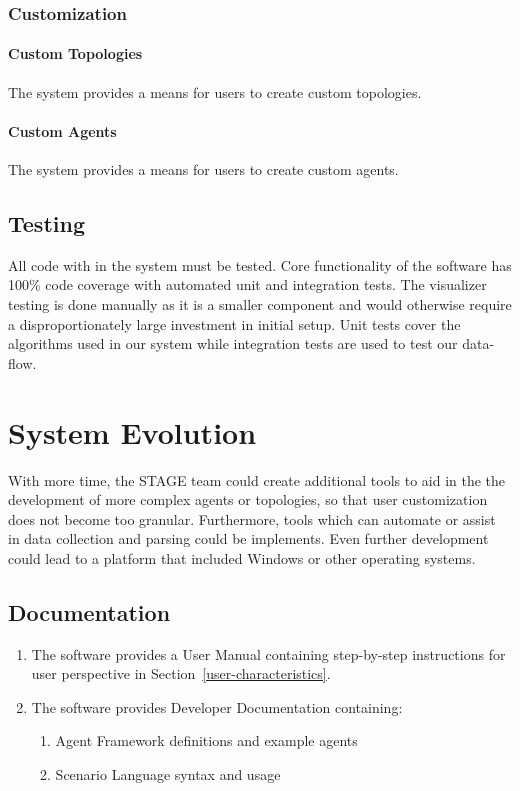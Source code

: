 \documentclass[titlepage]{article}
\begin{document}
\subsubsection{Customization}
    \paragraph{Custom Topologies} The system provides a means for users to create custom topologies.
    \paragraph{Custom Agents} The system provides a means for users to create custom agents.

\subsection{Testing%
    \label{testing}%
}
All code with in the system must be tested. Core functionality of the software has 100\% code coverage with automated unit and integration tests.  The visualizer testing is done manually as it is a smaller component and would otherwise require a disproportionately large investment in initial setup.  Unit tests cover the algorithms used in our system while integration tests are used to test our data-flow.  

\section{System Evolution}

With more time, the STAGE team could create additional tools to aid in the the development of more complex agents or topologies, so that user customization does not become too granular.  Furthermore, tools which can automate or assist in data collection and parsing could be implements.  Even further development could lead to a platform that included Windows or other operating systems.


\subsection{Documentation%
  \label{documentation}%
}
\begin{enumerate}
    \item The software provides a User Manual containing step-by-step instructions for user perspective in Section~\ref{user-characteristics}.
    \item The software provides Developer Documentation containing:
    \begin{enumerate}
        \item Agent Framework definitions and example agents
        \item Scenario Language syntax and usage
    \end{enumerate}
\end{enumerate}


\appendix
\pagebreak
\end{document}
